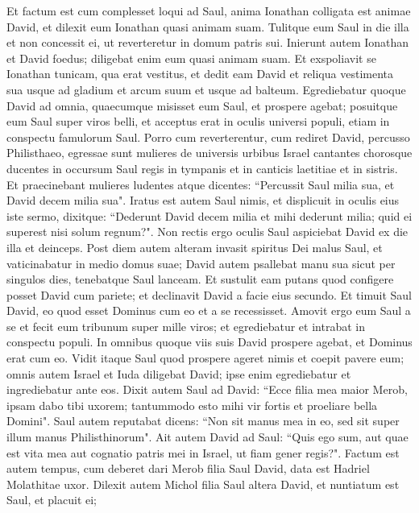\begin{biblechapter}  
\verse Et factum est cum complesset loqui ad Saul, anima Ionathan colligata est animae David, et dilexit eum Ionathan quasi animam suam. 
\verse Tulitque eum Saul in die illa et non concessit ei, ut reverteretur in domum patris sui. 
\verse Inierunt autem Ionathan et David foedus; diligebat enim eum quasi animam suam.  
\verse Et exspoliavit se Ionathan tunicam, qua erat vestitus, et dedit eam David et reliqua vestimenta sua usque ad gladium et arcum suum et usque ad balteum. 
\verse Egrediebatur quoque David ad omnia, quaecumque misisset eum Saul, et prospere agebat; posuitque eum Saul super viros belli, et acceptus erat in oculis universi populi, etiam in conspectu famulorum Saul. 
\verse Porro cum reverterentur, cum rediret David, percusso Philisthaeo, egressae sunt mulieres de universis urbibus Israel cantantes chorosque ducentes in occursum Saul regis in tympanis et in canticis laetitiae et in sistris. 
\verse Et praecinebant mulieres ludentes atque dicentes: “Percussit Saul milia sua, et David decem milia sua". 
\verse Iratus est autem Saul nimis, et displicuit in oculis eius iste sermo, dixitque: “Dederunt David decem milia et mihi dederunt milia; quid ei superest nisi solum regnum?". 
\verse Non rectis ergo oculis Saul aspiciebat David ex die illa et deinceps. 
\verse Post diem autem alteram invasit spiritus Dei malus Saul, et vaticinabatur in medio domus suae; David autem psallebat manu sua sicut per singulos dies, tenebatque Saul lanceam. 
\verse Et sustulit eam putans quod configere posset David cum pariete; et declinavit David a facie eius secundo. 
\verse Et timuit Saul David, eo quod esset Dominus cum eo et a se recessisset.  
\verse Amovit ergo eum Saul a se et fecit eum tribunum super mille viros; et egrediebatur et intrabat in conspectu populi. 
\verse In omnibus quoque viis suis David prospere agebat, et Dominus erat cum eo. 
\verse Vidit itaque Saul quod prospere ageret nimis et coepit pavere eum; 
\verse omnis autem Israel et Iuda diligebat David; ipse enim egrediebatur et ingrediebatur ante eos. 
\verse Dixit autem Saul ad David: “Ecce filia mea maior Merob, ipsam dabo tibi uxorem; tantummodo esto mihi vir fortis et proeliare bella Domini". Saul autem reputabat dicens: “Non sit manus mea in eo, sed sit super illum manus Philisthinorum". 
\verse Ait autem David ad Saul: “Quis ego sum, aut quae est vita mea aut cognatio patris mei in Israel, ut fiam gener regis?". 
\verse Factum est autem tempus, cum deberet dari Merob filia Saul David, data est Hadriel Molathitae uxor. 
\verse Dilexit autem Michol filia Saul altera David, et nuntiatum est Saul, et placuit ei; 

\end{biblechapter}
